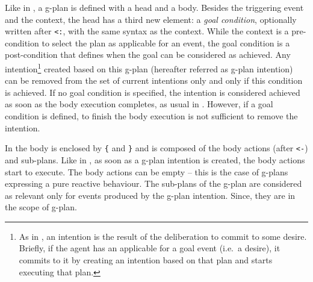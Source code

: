 Like in {\asl}, a g-plan is defined with a head and a body.
%
Besides the triggering event and the context, the head has a third new element: a \emph{goal condition}, optionally written after \texttt{<:}, with the same syntax as the context. While the context is a pre-condition to select the plan as applicable for an event, the goal condition is a post-condition that defines when the goal can be considered as achieved. Any intention\footnote{As in \asl, an intention is the result of the deliberation to commit to some desire. Briefly, if the agent has an applicable for a goal event (i.e.\ a desire), it commits to it by creating an intention based on that plan and starts executing that plan.} created based on this g-plan (hereafter referred as g-plan intention) can be removed from the set of current intentions only and only if this condition is achieved. If no goal condition is specified, the intention is considered achieved as soon as the body execution completes, as usual in \asl. However, if a goal condition is defined, to finish the body execution is not sufficient to remove the intention. 

In {\aser} the body is enclosed by \texttt{\{} and \texttt{\}} and is composed of the body actions (after \texttt{<-}) and sub-plans. 
%
Like in {\asl}, as soon as a g-plan intention is created, the body actions start to execute. The body actions can be empty -- this is the case of g-plans expressing a pure reactive behaviour.
%
The sub-plans of the g-plan are considered as relevant only for events produced by the g-plan intention. Since, they are in the scope of g-plan. 

%
%
%



